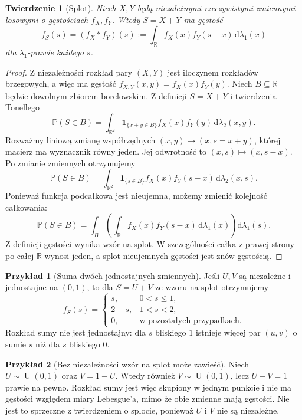 \documentclass[11pt,a4paper,oneside]{report}
\numberwithin{equation}{chapter}
\theoremstyle{plain}
\newtheorem{twierdzenie}{Twierdzenie}[chapter]
\theoremstyle{definition}
\newtheorem{przyklad}{Przykład}[chapter]
\theoremstyle{remark}
\newcommand{\R}{\mathbb{R}}
\newcommand{\Prob}{\mathbb{P}}
\newcommand{\ind}[1]{\mathbf{1}_{#1}}
\newcommand{\dd}{\mathrm{d}}
\newcommand{\Unif}{\operatorname{U}}
\begin{document}
\begin{twierdzenie}[Splot]
Niech $X,Y$ będą niezależnymi rzeczywistymi zmiennymi losowymi
o gęstościach $f_X,f_Y$. Wtedy $S=X+Y$ ma gęstość
\begin{equation}\label{eq:convolution}
 f_S(s)=(f_X*f_Y)(s)
 :=\int_\R f_X(x)f_Y(s-x)\,\dd\lambda_1(x)
\end{equation}
dla $\lambda_1$-prawie każdego $s$.
\end{twierdzenie}
\begin{proof}
Z niezależności rozkład pary $(X,Y)$ jest iloczynem
rozkładów brzegowych, a więc ma gęstość
$f_{X,Y}(x,y)=f_X(x)f_Y(y)$.
Niech $B\subseteq\R$ będzie dowolnym zbiorem borelowskim.
Z definicji $S=X+Y$ i twierdzenia Tonellego
\[
\Prob(S\in B)=\int_{\R^2}\ind{\{x+y\in B\}}
 f_X(x)f_Y(y)\,\dd\lambda_2(x,y).
\]
Rozważmy liniową zmianę współrzędnych
$(x,y)\mapsto (x,s=x+y)$, której macierz ma wyznacznik
równy jeden. Jej odwrotność to $(x,s)\mapsto(x,s-x)$.
Po zmianie zmiennych otrzymujemy
\[
\Prob(S\in B)=\int_{\R^2}\ind{\{s\in B\}}
 f_X(x)f_Y(s-x)\,\dd\lambda_2(x,s).
\]
Ponieważ funkcja podcałkowa jest nieujemna,
możemy zmienić kolejność całkowania:
\[
\Prob(S\in B)=\int_B\left(
\int_\R f_X(x)f_Y(s-x)\,\dd\lambda_1(x)
\right)\dd\lambda_1(s).
\]
Z definicji gęstości wynika wzór na splot. W szczególności
całka z prawej strony po całej $\R$ wynosi jeden,
a splot nieujemnych gęstości jest znów gęstością.
\end{proof}

\begin{przyklad}[Suma dwóch jednostajnych zmiennych]
Jeśli $U,V$ są niezależne i jednostajne na $(0,1)$,
to dla $S=U+V$ ze wzoru na splot otrzymujemy
\[
f_S(s)=\begin{cases}
s,&0<s\leq1,\\
2-s,&1<s<2,\\
0,&\text{w pozostałych przypadkach}.
\end{cases}
\]
Rozkład sumy nie jest jednostajny: dla $s$ bliskiego $1$
istnieje więcej par $(u,v)$ o sumie $s$ niż dla $s$ bliskiego $0$.
\end{przyklad}

\begin{przyklad}[Bez niezależności wzór na splot może zawieść]
Niech $U\sim\Unif(0,1)$ oraz $V=1-U$.
Wtedy również $V\sim\Unif(0,1)$, lecz $U+V=1$
prawie na pewno. Rozkład sumy jest więc skupiony
w jednym punkcie i nie ma gęstości względem miary
Lebesgue'a, mimo że obie zmienne mają gęstości.
Nie jest to sprzeczne z twierdzeniem o splocie,
ponieważ $U$ i $V$ nie są niezależne.
\end{przyklad}
\end{document}
